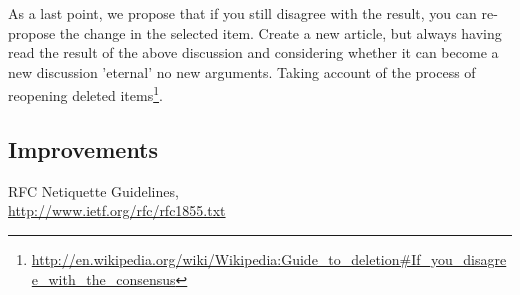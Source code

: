 \documentclass[11pt]{scrartcl}
\begin{document}
As a last point, we propose that if you still disagree with the result, you can re-propose the change in the selected item. Create a new article, but always having read the result of the above discussion and considering whether it can become a new discussion 'eternal' no new arguments. Taking account of the process of reopening deleted items\footnote{\url{http://en.wikipedia.org/wiki/Wikipedia:Guide_to_deletion\#If_you_disagree_with_the_consensus}}.


\subsection{Improvements}
\label{sub:}


\begin{thebibliography}{9}

    RFC Netiquette Guidelines,\\
    \url{http://www.ietf.org/rfc/rfc1855.txt}

\end{thebibliography}
\end{document}
